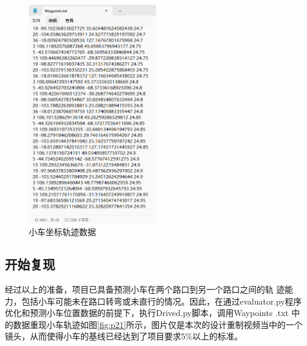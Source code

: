 \begin{figure}[htbp] %
	\centering
	\includegraphics[width=0.5\textwidth]{p20} %
	\caption{小车坐标轨迹数据} %
	\label{fig:p20} %
\end{figure}









\subsection{开始复现}

经过以上的准备，项目已具备预测小车在两个路口到另一个路口之间的轨 迹能力，包括小车可能未在路口转弯或未直行的情况。因此，在通过evaluator.py程序优化和预测小车位置数据的前提下，执行Drived.py脚本，调用Waypoints .txt 中的数据重现小车轨迹如图\ref{fig:p21}所示，图片仅是本次的设计重制视频当中的一个镜头，从而使得小车的基线已经达到了项目要求5\%以上的标准。


